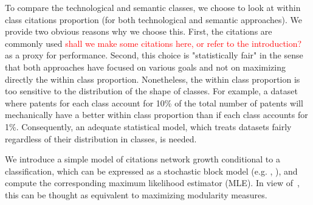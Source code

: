 \documentclass[10pt,A4]{article}
\begin{document}
To compare the technological and semantic classes, we choose to look at within class citations proportion (for both technological and semantic approaches). We provide two obvious reasons why we choose this. First, the citations are commonly used \textcolor{red}{shall we make some citations here, or refer to the introduction?} as a proxy for performance. Second, this choice is "statistically fair" in the sense that both approaches have focused on various goals and not on maximizing directly the within class proportion. 
Nonetheless, the within class proportion is too sensitive to the distribution of the shape of classes. For example, a dataset where patents for each class account for 10\% of the total number of patents will mechanically have a better within class proportion than if each class accounts for 1\%. Consequently, an adequate statistical model, which treats datasets fairly regardless of their distribution in classes, is needed. 

We introduce a simple model of citations network growth conditional to a classification, which can be expressed as a stochastic block model (e.g. \cite{decelle2011asymptotic}, \cite{valles2016multilayer}), and compute the corresponding maximum likelihood estimator (MLE). In view of~\cite{2016arXiv160602319N}, this can be thought as equivalent to maximizing modularity measures.
\end{document}
